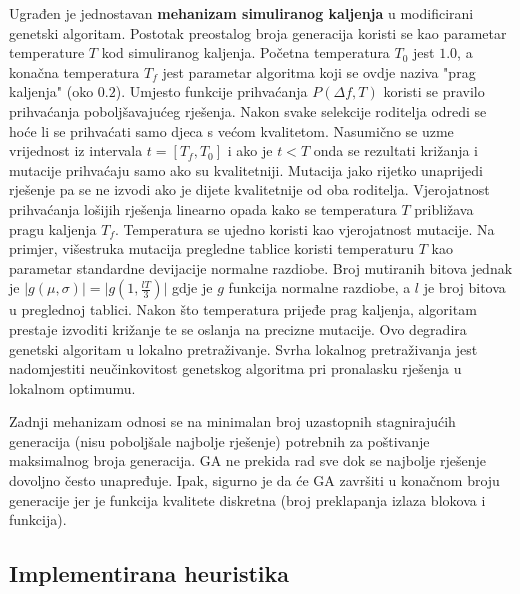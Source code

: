 \documentclass[times, utf8, diplomski]{fer}
\begin{document}
Ugrađen je jednostavan \textbf{mehanizam simuliranog kaljenja} u modificirani genetski algoritam. Postotak preostalog broja generacija koristi se kao parametar temperature $T$ kod simuliranog kaljenja. Početna temperatura $T_{0}$ jest $1.0$, a konačna temperatura $T_{f}$ jest parametar algoritma koji se ovdje naziva "prag kaljenja" (oko $0.2$). Umjesto funkcije prihvaćanja $P(\Delta f, T)$ koristi se pravilo prihvaćanja poboljšavajućeg rješenja. Nakon svake selekcije roditelja odredi se hoće li se prihvaćati samo djeca s većom kvalitetom. Nasumično se uzme vrijednost iz intervala $t=[T_{f}, T_{0}]$ i ako je $t<T$ onda se rezultati križanja i mutacije prihvaćaju samo ako su kvalitetniji. Mutacija jako rijetko unaprijedi rješenje pa se ne izvodi ako je dijete kvalitetnije od oba roditelja. Vjerojatnost prihvaćanja lošijih rješenja linearno opada kako se temperatura $T$ približava pragu kaljenja $T_{f}$. Temperatura se ujedno koristi kao vjerojatnost mutacije. Na primjer, višestruka mutacija pregledne tablice koristi temperaturu $T$ kao parametar standardne devijacije normalne razdiobe. Broj mutiranih bitova jednak je $\lvert g(\mu, \sigma) \rvert = \lvert g(1, \frac{lT}{3}) \rvert$ gdje je $g$ funkcija normalne razdiobe, a $l$ je broj bitova u preglednoj tablici. Nakon što temperatura prijeđe prag kaljenja, algoritam prestaje izvoditi križanje te se oslanja na precizne mutacije. Ovo degradira genetski algoritam u lokalno pretraživanje. Svrha lokalnog pretraživanja jest nadomjestiti neučinkovitost genetskog algoritma pri pronalasku rješenja u lokalnom optimumu.

Zadnji mehanizam odnosi se na minimalan broj uzastopnih stagnirajućih generacija (nisu poboljšale najbolje rješenje) potrebnih za poštivanje maksimalnog broja generacija. GA ne prekida rad sve dok se najbolje rješenje dovoljno često unapređuje. Ipak, sigurno je da će GA završiti u konačnom broju generacije jer je funkcija kvalitete diskretna (broj preklapanja izlaza blokova i funkcija).

\subsection{Implementirana heuristika} \label{subsec:solver}
\end{document}
